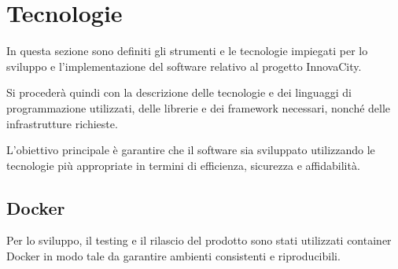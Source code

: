 \section{Tecnologie}
In questa sezione sono definiti gli strumenti e le tecnologie impiegati per lo sviluppo e l'implementazione del software relativo al progetto InnovaCity.

Si procederà quindi con la descrizione delle tecnologie e dei linguaggi di programmazione utilizzati, delle librerie e dei framework necessari, nonché delle infrastrutture richieste.

L'obiettivo principale è garantire che il software sia sviluppato utilizzando le tecnologie più appropriate in termini di efficienza, sicurezza e affidabilità.

\subsection{Docker}
Per lo sviluppo, il testing e il rilascio del prodotto sono stati utilizzati container Docker in modo tale da garantire ambienti consistenti e riproducibili.

